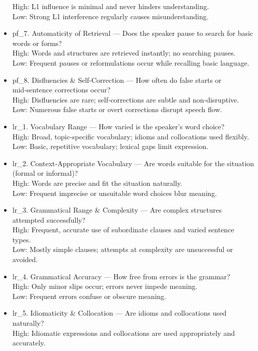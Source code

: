 \documentclass{report}
\begin{document}
\begin{tcolorbox}[breakable, colback=white, colframe=black, title=Revised Question Set Batch Prompt]
\begin{itemize}
    High: L1 influence is minimal and never hinders understanding.\\
    Low: Strong L1 interference regularly causes misunderstanding.
  \item pf\_7. Automaticity of Retrieval — Does the speaker pause to search for basic words or forms?\\
    High: Words and structures are retrieved instantly; no searching pauses.\\
    Low: Frequent pauses or reformulations occur while recalling basic language.
  \item pf\_8. Disfluencies \& Self‑Correction — How often do false starts or mid‑sentence corrections occur?\\
    High: Disfluencies are rare; self‑corrections are subtle and non‑disruptive.\\
    Low: Numerous false starts or overt corrections disrupt speech flow.
  \item lr\_1. Vocabulary Range — How varied is the speaker’s word choice?\\
    High: Broad, topic‑specific vocabulary; idioms and collocations used flexibly.\\
    Low: Basic, repetitive vocabulary; lexical gaps limit expression.
  \item lr\_2. Context‑Appropriate Vocabulary — Are words suitable for the situation (formal or informal)?\\
    High: Words are precise and fit the situation naturally.\\
    Low: Frequent imprecise or unsuitable word choices blur meaning.
  \item lr\_3. Grammatical Range \& Complexity — Are complex structures attempted successfully?\\
    High: Frequent, accurate use of subordinate clauses and varied sentence types.\\
    Low: Mostly simple clauses; attempts at complexity are unsuccessful or avoided.
  \item lr\_4. Grammatical Accuracy — How free from errors is the grammar?\\
    High: Only minor slips occur; errors never impede meaning.\\
    Low: Frequent errors confuse or obscure meaning.
  \item lr\_5. Idiomaticity \& Collocation — Are idioms and collocations used naturally?\\
    High: Idiomatic expressions and collocations are used appropriately and accurately.\\

\end{itemize}
\end{tcolorbox}
\end{document}

